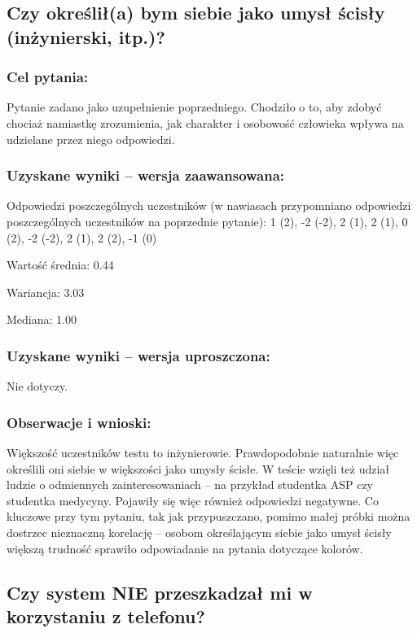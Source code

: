 \subsection{Czy określił(a) bym siebie jako umysł ścisły (inżynierski, itp.)?}

	\subsubsection{Cel pytania:}
	
	Pytanie zadano jako uzupełnienie poprzedniego. Chodziło o to, aby zdobyć chociaż namiastkę zrozumienia, jak charakter i osobowość człowieka wpływa na udzielane przez niego odpowiedzi. 
	
	\subsubsection{Uzyskane wyniki -- wersja zaawansowana:}
	
	Odpowiedzi poszczególnych uczestników (w nawiasach przypomniano odpowiedzi poszczególnych uczestników na poprzednie pytanie): 1 (2), -2 (-2), 2 (1), 2 (1), 0 (2), -2 (-2), 2 (1), 2 (2), -1 (0)

	Wartość średnia: 0.44
	
	Wariancja: 3.03
	
	Mediana: 1.00
	
	\subsubsection{Uzyskane wyniki -- wersja uproszczona:}
	
	Nie dotyczy.
	
	\subsubsection{Obserwacje i wnioski:}
	
	Większość uczestników testu to inżynierowie. Prawdopodobnie naturalnie więc określili oni siebie w większości jako umysły ścisłe. W teście wzięli też udział ludzie o odmiennych zainteresowaniach -- na przykład studentka ASP czy studentka medycyny. Pojawiły się więc również odpowiedzi negatywne. Co kluczowe przy tym pytaniu, tak jak przypuszczano, pomimo małej próbki można dostrzec nieznaczną korelację -- osobom określającym siebie jako umysł ścisły większą trudność sprawiło odpowiadanie na pytania dotyczące kolorów.
	
	
\subsection{Czy system NIE przeszkadzał mi w korzystaniu z telefonu?}
	
